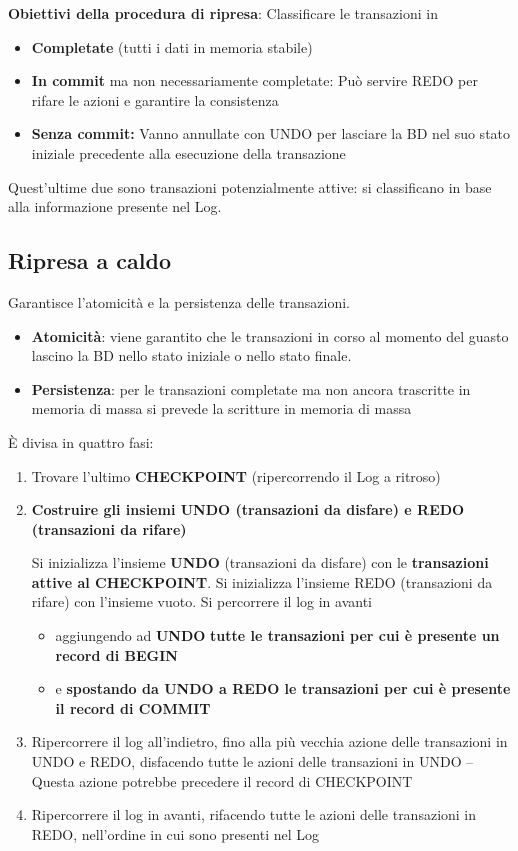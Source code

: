 \documentclass{article}
\newcommand{\sitemize}[1]{%
	\begin{itemize}[label=$\diamond$]
		#1
	\end{itemize}
}
\begin{document}
\textbf{Obiettivi della procedura di ripresa}: Classificare le transazioni in \begin{itemize}
	\item \textbf{Completate} (tutti i dati in memoria stabile)
	\item \textbf{In commit} ma non necessariamente completate: Può servire REDO per rifare le azioni e garantire la consistenza
	\item\textbf{ Senza commit:} Vanno annullate con UNDO per lasciare la BD nel suo stato iniziale precedente alla esecuzione della transazione
\end{itemize}
Quest'ultime due sono transazioni potenzialmente attive: si classificano in base alla informazione presente nel Log.

\subsection{Ripresa a caldo}
 Garantisce l’atomicità e la persistenza delle transazioni.\begin{itemize}
 	\item  \textbf{Atomicità}: viene garantito che le transazioni in corso al momento del guasto lascino la BD nello stato iniziale o nello stato finale. \item \textbf{Persistenza}: per le transazioni completate ma non ancora trascritte in memoria di massa si prevede la scritture in memoria di massa
 \end{itemize}
 
 È divisa in quattro fasi:\begin{enumerate}
 	\item Trovare l'ultimo \textbf{CHECKPOINT} (ripercorrendo il Log
 	a ritroso)
 	\item \textbf{Costruire gli insiemi UNDO (transazioni da disfare) e REDO (transazioni da rifare)}
 	
 	Si inizializza l’insieme \textbf{UNDO} (transazioni da disfare) con le \textbf{transazioni attive al CHECKPOINT}. Si inizializza l’insieme REDO (transazioni da rifare)	con l’insieme vuoto. Si percorrere il log in avanti
 	\sitemize{\item aggiungendo ad \textbf{UNDO}\textbf{ tutte le transazioni per cui è
 		presente un record di BEGIN}
 		\item e \textbf{spostando da UNDO a REDO le transazioni per cui è
 		presente il record di COMMIT}}
 	
 	\item Ripercorrere il log all'indietro, fino alla più vecchia azione delle transazioni in UNDO e REDO,	disfacendo tutte le azioni delle transazioni in UNDO – Questa azione potrebbe precedere il record di
 	CHECKPOINT
 	\item Ripercorrere il log in avanti, rifacendo tutte le azioni
 	delle transazioni in REDO, nell’ordine in cui sono 	presenti nel Log
 \end{enumerate}
 
\end{document}

